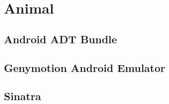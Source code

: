 \section{Animal}
	\subsection{Android ADT Bundle} 
	
	\subsection{Genymotion Android Emulator}

	\subsection{Sinatra}